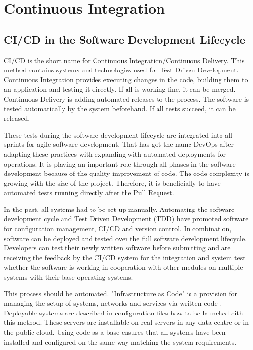 \chapter{Continuous Integration}\label{ch:ci_cd}

\section{CI/CD in the Software Development Lifecycle}

\gls{CI/CD} is the short name for Continuous Integration/Continuous Delivery. This method contains systems and technologies used for Test Driven Development. Continuous Integration provides executing changes in the code, building them to an application and testing it directly. 
If all is working fine, it can be merged. Continuous Delivery is adding automated releases to the process. 
The software is tested automatically by the system beforehand. If all tests succeed, it can be released.

These tests during the software development lifecycle are integrated into all sprints for agile software development. That has got the name DevOps after adapting these practices with expanding with automated deployments for operations. It is playing an important role through all phases in the software development because of the quality improvement of code. The code complexity is growing with the size of the project. Therefore, it is beneficially to have automated tests running directly after the Pull Request. 

In the past, all systems had to be set up manually. Automating the software development cycle and Test Driven Development (TDD) have promoted software for configuration management, \gls{CI/CD} and version control. In combination, software can be deployed and tested over the full software development lifecycle. Developers can test their newly written software before submitting and are receiving the feedback by the \gls{CI/CD} system for the integration and system test whether the software is working in cooperation with other modules on multiple systems with their base operating systems.

This process should be automated. "Infrastructure as Code" is a provision for managing the setup of systems, networks and services via written code \cite[~p.110]{Scholl2019}. Deployable systems are described in configuration files how to be launched eith this method. These servers are installable on real servers in any data centre or in the public cloud. Using code as a base ensures that all systems have been installed and configured on the same way matching the system requirements. 

